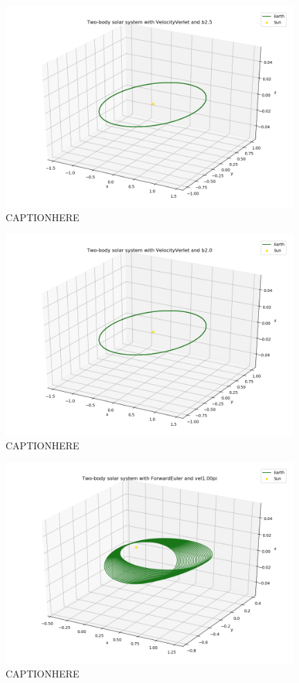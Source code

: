 \documentclass{article}
\begin{document}
    \begin{figure}[H]
        \centering
        \includegraphics[width = 11cm]{img/plot3D_S_E_V_b25.png}
        \caption{CAPTIONHERE}
        \label{fig:plot3D_S_E_V_b25}
    \end{figure}

    \begin{figure}[H]
        \centering
        \includegraphics[width = 11cm]{img/plot3D_S_E_V_b20.png}
        \caption{CAPTIONHERE}
        \label{fig:plot3D_S_E_V_b26}
    \end{figure}

    \begin{figure}[H]
        \centering
        \includegraphics[width = 11cm]{img/plot3D_S_E_F_vel100pi.png}
        \caption{CAPTIONHERE}
        \label{fig:plot3D_S_E_F_vel100pi}
    \end{figure}
\end{document}
